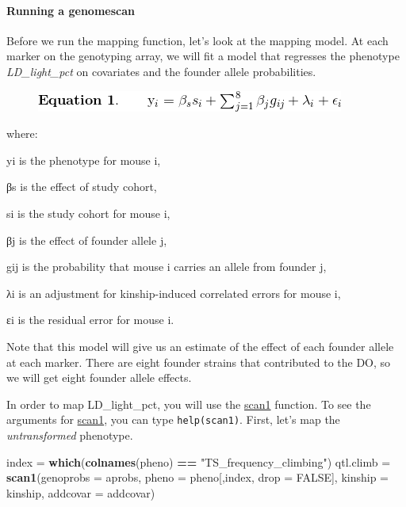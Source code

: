 \documentclass[]{article}
\newenvironment{Shaded}{\begin{snugshade}}{\end{snugshade}}
\newcommand{\KeywordTok}[1]{\textcolor[rgb]{0.13,0.29,0.53}{\textbf{#1}}}
\newcommand{\DataTypeTok}[1]{\textcolor[rgb]{0.13,0.29,0.53}{#1}}
\newcommand{\StringTok}[1]{\textcolor[rgb]{0.31,0.60,0.02}{#1}}
\newcommand{\OtherTok}[1]{\textcolor[rgb]{0.56,0.35,0.01}{#1}}
\newcommand{\OperatorTok}[1]{\textcolor[rgb]{0.81,0.36,0.00}{\textbf{#1}}}
\newcommand{\NormalTok}[1]{#1}
\let\oldparagraph\paragraph
\renewcommand{\paragraph}[1]{\oldparagraph{#1}\mbox{}}
\begin{document}
\paragraph{\texorpdfstring{\textbf{Running a
genomescan}}{Running a genomescan}}\label{running-a-genomescan}

Before we run the mapping function, let's look at the mapping model. At
each marker on the genotyping array, we will fit a model that regresses
the phenotype \emph{LD\_light\_pct} on covariates and the founder allele
probabilities.

\begin{figure}
\centering
\includegraphics{../figs/equation1.png}
\caption{}
\end{figure}

where:

yi is the phenotype for mouse i,

βs is the effect of study cohort,

si is the study cohort for mouse i,

βj is the effect of founder allele j,

gij is the probability that mouse i carries an allele from founder j,

λi is an adjustment for kinship-induced correlated errors for mouse i,

εi is the residual error for mouse i.

Note that this model will give us an estimate of the effect of each
founder allele at each marker. There are eight founder strains that
contributed to the DO, so we will get eight founder allele effects.

In order to map LD\_light\_pct, you will use the
\href{https://github.com/rqtl/qtl2/blob/master/R/plot_scan1.R}{scan1}
function. To see the arguments for
\href{https://github.com/rqtl/qtl2/blob/master/R/plot_scan1.R}{scan1},
you can type \texttt{help(scan1)}. First, let's map the
\emph{untransformed} phenotype.

\begin{Shaded}
\begin{Highlighting}[]
\NormalTok{index =}\StringTok{ }\KeywordTok{which}\NormalTok{(}\KeywordTok{colnames}\NormalTok{(pheno) }\OperatorTok{==}\StringTok{ "TS_frequency_climbing"}\NormalTok{)}
\NormalTok{qtl.climb =}\StringTok{ }\KeywordTok{scan1}\NormalTok{(}\DataTypeTok{genoprobs =}\NormalTok{ aprobs, }\DataTypeTok{pheno =}\NormalTok{ pheno[,index, }\DataTypeTok{drop =} \OtherTok{FALSE}\NormalTok{], }\DataTypeTok{kinship =}\NormalTok{ kinship, }\DataTypeTok{addcovar =}\NormalTok{ addcovar)}
\end{Highlighting}
\end{Shaded}
\end{document}
